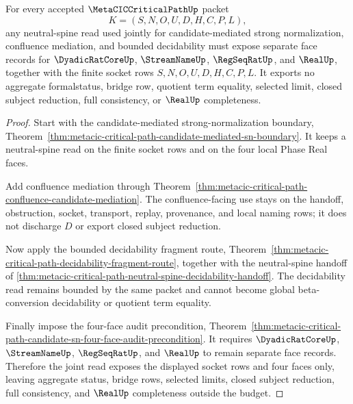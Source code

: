 \begin{theorem}
\label{thm:metacic-critical-path-neutral-spine-four-face-budget}
For every accepted $\MetaCICCriticalPathUp$ packet
$$
K=(S,N,O,U,D,H,C,P,L),
$$
any neutral-spine read used jointly for candidate-mediated strong
normalization, confluence mediation, and bounded decidability must expose
separate face records for $\DyadicRatCoreUp$, $\StreamNameUp$,
$\RegSeqRatUp$, and $\RealUp$, together with the finite socket rows
$S,N,O,U,D,H,C,P,L$. It exports no aggregate formalstatus, bridge row,
quotient term equality, selected limit, closed subject reduction, full
consistency, or $\RealUp$ completeness.
\end{theorem}
\begin{proof}
Start with the candidate-mediated strong-normalization boundary,
Theorem~\ref{thm:metacic-critical-path-candidate-mediated-sn-boundary}. It
keeps a neutral-spine read on the finite socket rows and on the four local
Phase Real faces.

Add confluence mediation through
Theorem~\ref{thm:metacic-critical-path-confluence-candidate-mediation}. The
confluence-facing use stays on the handoff, obstruction, socket, transport,
replay, provenance, and local naming rows; it does not discharge $D$ or
export closed subject reduction.

Now apply the bounded decidability fragment route,
Theorem~\ref{thm:metacic-critical-path-decidability-fragment-route}, together
with the neutral-spine handoff of
\autoref{thm:metacic-critical-path-neutral-spine-decidability-handoff}. The
decidability read remains bounded by the same packet and cannot become
global beta-conversion decidability or quotient term equality.

Finally impose the four-face audit precondition,
Theorem~\ref{thm:metacic-critical-path-candidate-sn-four-face-audit-precondition}.
It requires $\DyadicRatCoreUp$, $\StreamNameUp$, $\RegSeqRatUp$, and
$\RealUp$ to remain separate face records. Therefore the joint read exposes
the displayed socket rows and four faces only, leaving aggregate status,
bridge rows, selected limits, closed subject reduction, full consistency,
and $\RealUp$ completeness outside the budget.
\end{proof}


